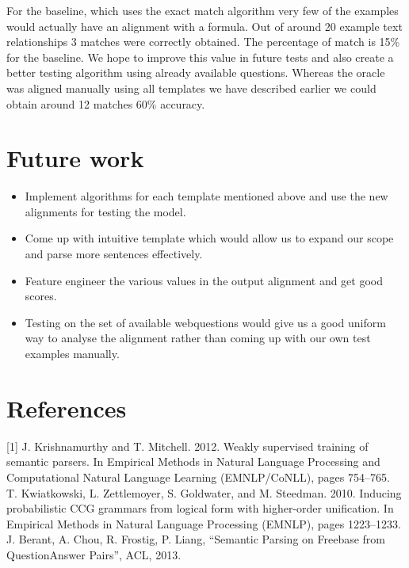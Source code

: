 \documentclass[12pt, a4paper]{article}
\begin{document}
For the baseline, which uses the exact match algorithm very few of the examples would actually have an alignment with a formula. Out of around 20 example text relationships 3 matches were correctly obtained. The percentage of match is 15\% for the baseline. We hope to improve this value in future tests and also create a better testing algorithm using already available questions. Whereas the oracle was aligned manually using all templates we have described earlier we could obtain around 12 matches 60\% accuracy.

\section{Future work}
\begin{itemize}
\item Implement algorithms for each template mentioned above and use the new alignments for testing the model.
\item Come up with intuitive template which would allow us to expand our scope and parse more sentences effectively.
\item Feature engineer the various values in the output alignment and get good scores.
\item Testing on the set of available webquestions would give us a good uniform way to analyse the alignment rather than coming up with our own test examples manually.
\end{itemize}


\section{References}
[1] J. Krishnamurthy and T. Mitchell. 2012. Weakly supervised training of semantic parsers. In Empirical Methods in Natural Language Processing and Computational Natural Language Learning (EMNLP/CoNLL), pages 754–765.\\

\noindent[2] T. Kwiatkowski, L. Zettlemoyer, S. Goldwater, and M. Steedman. 2010. Inducing probabilistic CCG grammars from logical form with higher-order unification. In Empirical Methods in Natural Language Processing (EMNLP), pages 1223–1233.\\

\noindent[3] J. Berant, A. Chou, R. Frostig, P. Liang, “Semantic Parsing on Freebase from QuestionAnswer Pairs”, ACL, 2013.
\end{document}
